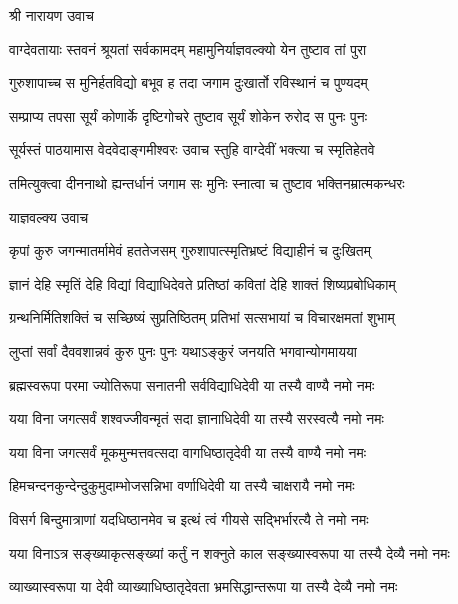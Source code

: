 
श्री नारायण उवाच 

\twolineshloka
{वाग्देवतायाः स्तवनं श्रूयतां सर्वकामदम्}
{महामुनिर्याज्ञवल्क्यो येन तुष्टाव तां पुरा}%

\twolineshloka
{गुरुशापाच्च स मुनिर्हतविद्यो बभूव ह}
{तदा जगाम दुःखार्तो रविस्थानं च पुण्यदम्}%

\twolineshloka
{सम्प्राप्य तपसा सूर्यं कोणार्के दृष्टिगोचरे}
{तुष्टाव सूर्यं शोकेन रुरोद स पुनः पुनः}%

\twolineshloka
{सूर्यस्तं पाठयामास वेदवेदाङ्गमीश्वरः}
{उवाच स्तुहि वाग्देवीं भक्त्या च स्मृतिहेतवे}%

\twolineshloka
{तमित्युक्त्वा दीननाथो ह्यन्तर्धानं जगाम सः}
{मुनिः स्नात्वा च तुष्टाव भक्तिनम्रात्मकन्धरः}%

याज्ञवल्क्य उवाच

\twolineshloka
{कृपां कुरु जगन्मातर्मामेवं हततेजसम्}
{गुरुशापात्स्मृतिभ्रष्टं विद्याहीनं च दुःखितम्}%

\twolineshloka
{ज्ञानं देहि स्मृतिं देहि विद्यां विद्याधिदेवते}
{प्रतिष्ठां कवितां देहि शाक्तं शिष्यप्रबोधिकाम्}%

\twolineshloka
{ग्रन्थनिर्मितिशक्तिं च सच्छिष्यं सुप्रतिष्ठितम्}
{प्रतिभां सत्सभायां च विचारक्षमतां शुभाम्}%

\twolineshloka
{लुप्तां सर्वां दैववशान्नवं कुरु पुनः पुनः}
{यथाऽङ्कुरं जनयति भगवान्योगमायया}%

\twolineshloka
{ब्रह्मस्वरूपा परमा ज्योतिरूपा सनातनी}
{सर्वविद्याधिदेवी या तस्यै वाण्यै नमो नमः}%

\twolineshloka
{यया विना जगत्सर्वं शश्वज्जीवन्मृतं सदा}
{ज्ञानाधिदेवी या तस्यै सरस्वत्यै नमो नमः}%

\twolineshloka
{यया विना जगत्सर्वं मूकमुन्मत्तवत्सदा}
{वागधिष्ठातृदेवी या तस्यै वाण्यै नमो नमः}%

\twolineshloka
{हिमचन्दनकुन्देन्दुकुमुदाम्भोजसन्निभा}
{वर्णाधिदेवी या तस्यै चाक्षरायै नमो नमः}%

\twolineshloka
{विसर्ग बिन्दुमात्राणां यदधिष्ठानमेव च}
{इत्थं त्वं गीयसे सद्भिर्भारत्यै ते नमो नमः}%

\twolineshloka
{यया विनाऽत्र सङ्ख्याकृत्सङ्ख्यां कर्तुं न शक्नुते}
{काल सङ्ख्यास्वरूपा या तस्यै देव्यै नमो नमः}%

\twolineshloka
{व्याख्यास्वरूपा या देवी व्याख्याधिष्ठातृदेवता}
{भ्रमसिद्धान्तरूपा या तस्यै देव्यै नमो नमः}%

